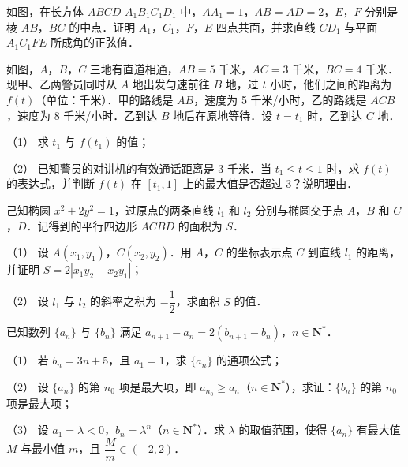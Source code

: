 \Needspace{0.4\textheight}
\begin{question}
如图，在长方体 \(ABCD\text{-}A_{1}B_{1}C_{1}D_{1}\) 中，\(AA_{1}=1\)，\(AB=AD=2\)，\(E\)，\(F\) 分别是棱 \(AB\)，\(BC\) 的中点．证明 \(A_{1}\)，\(C_{1}\)，\(F\)，\(E\) 四点共面，并求直线 \(CD_{1}\) 与平面 \(A_{1}C_{1}FE\) 所成角的正弦值．
\nopagebreak[4]
\begin{center}\end{center}
\nopagebreak[4]
\Needspace{0.4\textheight}
\end{question}
\begin{question}
如图，\(A\)，\(B\)，\(C\) 三地有直道相通，\(AB=5\) 千米，\(AC=3\) 千米，\(BC=4\) 千米．现甲、乙两警员同时从 \(A\) 地出发匀速前往 \(B\) 地，过 \(t\) 小时，他们之间的距离为 \(f(t)\)（单位：千米）．甲的路线是 \(AB\)，速度为 5 千米/小时，乙的路线是 \(ACB\)，速度为 8 千米/小时．乙到达 \(B\) 地后在原地等待．设 \(t=t_{1}\) 时，乙到达 \(C\) 地．

（1） 求 \(t_{1}\) 与 \(f(t_{1})\) 的值；

（2） 已知警员的对讲机的有效通话距离是 3 千米．当 \(t_{1}\leqslant t\leqslant 1\) 时，求 \(f(t)\) 的表达式，并判断 \(f(t)\) 在 \([t_{1},1]\) 上的最大值是否超过 3？说明理由．
\nopagebreak[4]
\begin{center}\end{center}
\nopagebreak[4]
\end{question}
\begin{question}
己知椭圆 \(x^{2}+2y^{2}=1\)，过原点的两条直线 \(l_{1}\) 和 \(l_{2}\) 分别与椭圆交于点 \(A\)，\(B\) 和 \(C\)，\(D\)．记得到的平行四边形 \(ACBD\) 的面积为 \(S\)．

（1） 设 \(A(x_{1},y_{1})\)，\(C(x_{2},y_{2})\)．用 \(A\)，\(C\) 的坐标表示点 \(C\) 到直线 \(l_{1}\) 的距离，并证明 \(S=2|x_{1}y_{2}-x_{2}y_{1}|\)；

（2） 设 \(l_{1}\) 与 \(l_{2}\) 的斜率之积为 \(-\dfrac{1}{2}\)，求面积 \(S\) 的值．

\end{question}
\begin{question}
已知数列 \(\{a_{n}\}\) 与 \(\{b_{n}\}\) 满足 \(a_{n+1}-a_{n}=2(b_{n+1}-b_{n})\)，\(n\in\mathbf{N}^{*}\)．

（1） 若 \(b_{n}=3n+5\)，且 \(a_{1}=1\)，求 \(\{a_{n}\}\) 的通项公式；

（2） 设 \(\{a_{n}\}\) 的第 \(n_{0}\) 项是最大项，即 \(a_{n_{0}}\geqslant a_{n}\)（\(n\in\mathbf{N}^{*}\)），求证：\(\{b_{n}\}\) 的第 \(n_{0}\) 项是最大项；

（3） 设 \(a_{1}=\lambda<0\)，\(b_{n}=\lambda^{n}\)（\(n\in\mathbf{N}^{*}\)）．求 \(\lambda\) 的取值范围，使得 \(\{a_{n}\}\) 有最大值 \(M\) 与最小值 \(m\)，且 \(\dfrac{M}{m}\in(-2,2)\)．

\end{question}
